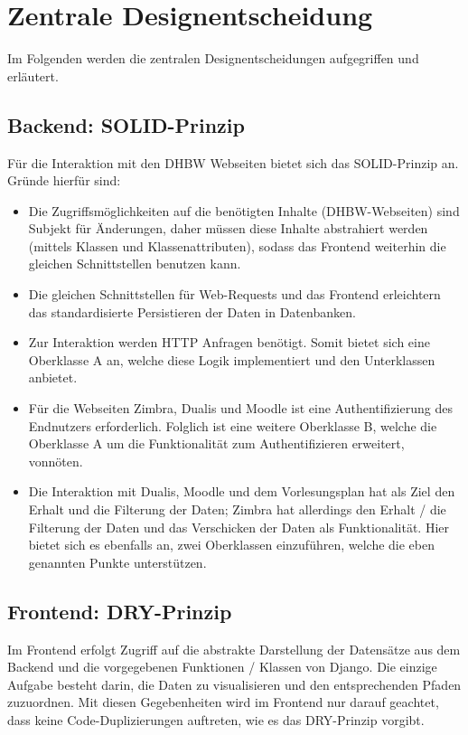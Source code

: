 \documentclass[a4paper,11pt]{scrartcl}
\begin{document}
\section{Zentrale Designentscheidung}
Im Folgenden werden die zentralen Designentscheidungen aufgegriffen und erläutert.
    \subsection{Backend: SOLID-Prinzip}
Für die Interaktion mit den DHBW Webseiten bietet sich das SOLID-Prinzip an. \\
Gründe hierfür sind:
\begin{itemize}
    \item{Die Zugriffsmöglichkeiten auf die benötigten Inhalte (DHBW-Webseiten) sind Subjekt für Änderungen,
    daher müssen diese Inhalte abstrahiert werden (mittels Klassen und Klassenattributen),
    sodass das Frontend weiterhin die gleichen Schnittstellen benutzen kann.}
    \item{Die gleichen Schnittstellen für Web-Requests und das Frontend erleichtern das standardisierte Persistieren der Daten
    in Datenbanken.}
    \item{Zur Interaktion werden HTTP Anfragen benötigt. Somit bietet sich eine Oberklasse A an,
    welche diese Logik implementiert und den Unterklassen anbietet.}
    \item{Für die Webseiten Zimbra, Dualis und Moodle ist eine Authentifizierung des Endnutzers erforderlich.
    Folglich ist eine weitere Oberklasse B, welche die Oberklasse A um die Funktionalität zum Authentifizieren erweitert, vonnöten.}
    \item{Die Interaktion mit Dualis, Moodle und dem Vorlesungsplan hat als Ziel den Erhalt und die Filterung der Daten;
    Zimbra hat allerdings den Erhalt / die Filterung der Daten und das Verschicken der Daten als Funktionalität.
    Hier bietet sich es ebenfalls an, zwei Oberklassen einzuführen, welche die eben genannten Punkte unterstützen.}
\end{itemize}

    \subsection{Frontend: DRY-Prinzip}
Im Frontend erfolgt Zugriff auf die abstrakte Darstellung der \textquotedbl Datensätze\textquotedbl{} aus dem Backend und
die vorgegebenen Funktionen / Klassen von Django. Die einzige Aufgabe besteht darin, die Daten zu visualisieren und
den entsprechenden Pfaden zuzuordnen. Mit diesen Gegebenheiten wird im Frontend \textquotedbl nur\textquotedbl{}
darauf geachtet, dass keine Code-Duplizierungen auftreten, wie es das DRY-Prinzip vorgibt.
\end{document}
